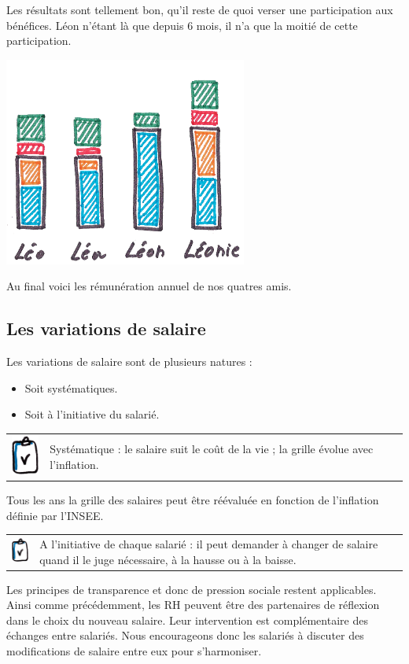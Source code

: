 \documentclass[12pt]{article}
\newcommand{\regle}[1]{%
  \begin{tcolorbox}[colframe=DarkOrange,boxrule=2pt,arc=4pt,left=6pt,right=6pt,top=6pt,bottom=6pt,boxsep=0pt,colback=LightOrange]
    \begin{tabular}{m{1.0cm} m{11.5cm}}
      \includegraphics[width=1.0cm]{includes/rules} & #1 \\
    \end{tabular}
  \end{tcolorbox}
}
\begin{document}
 Les résultats sont tellement bon, qu’il reste de quoi verser une participation aux bénéfices. Léon n’étant là que depuis 6 mois, il n’a que la moitié de cette participation.

 \begin{center}
 \includegraphics[width=0.6\textwidth]{includes/remuneration}
 \end{center}
 Au final voici les rémunération annuel de nos quatres amis.

\subsection{Les variations de salaire}
\label{sec.variation-salaire}
 Les variations de salaire sont de plusieurs natures : 
 \begin{itemize}
   \item Soit systématiques.
   \item Soit à l’initiative du salarié.
 \end{itemize}

 \vspace{3mm}
 \regle{Systématique : le salaire suit le coût de la vie ; la grille évolue avec l’inflation.}

 Tous les ans la grille des salaires peut être réévaluée en fonction de l’inflation définie par l’INSEE.

 \regle{A l'initiative de chaque salarié : il peut demander à changer de salaire quand il le juge nécessaire, à la hausse ou à la baisse.}

 Les principes de transparence et donc de pression sociale restent applicables. Ainsi comme précédemment, les RH peuvent être des partenaires de réflexion dans le choix du nouveau salaire. Leur intervention est complémentaire des échanges entre salariés. Nous encourageons donc les salariés à discuter des modifications de salaire entre eux pour s’harmoniser. 
\end{document}
